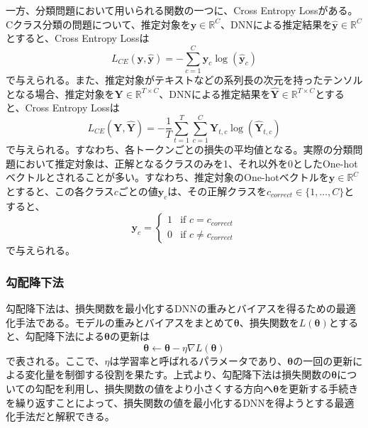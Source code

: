 \documentclass[12pt]{jarticle}
\numberwithin{equation}{section}    %
\numberwithin{figure}{section}      %
\numberwithin{table}{section}      %
\begin{document}
一方、分類問題において用いられる関数の一つに、Cross Entropy Lossがある。Cクラス分類の問題について、推定対象を$\bm{y} \in \mathbb{R}^{C}$、DNNによる推定結果を$\hat{\bm{y}} \in \mathbb{R}^{C}$とすると、Cross Entropy Lossは
\begin{equation}
    L_{CE}(\bm{y}, \hat{\bm{y}}) = - \sum_{c = 1}^{C} \bm{y}_{c}\log(\hat{\bm{y}}_{c})
\end{equation}
で与えられる。また、推定対象がテキストなどの系列長の次元を持ったテンソルとなる場合、推定対象を$\bm{Y} \in \mathbb{R}^{T \times C}$、DNNによる推定結果を$\hat{\bm{Y}} \in \mathbb{R}^{T \times C}$とすると、Cross Entropy Lossは
\begin{equation}
    L_{CE}(\bm{Y}, \hat{\bm{Y}}) = - \frac{1}{T} \sum_{t = 1}^{T} \sum_{c = 1}^{C} \bm{Y}_{t, c}\log(\hat{\bm{Y}}_{t, c})
\end{equation}
で与えられる。すなわち、各トークンごとの損失の平均値となる。実際の分類問題において推定対象は、正解となるクラスのみを1、それ以外を0としたOne-hotベクトルとされることが多い。すなわち、推定対象のOne-hotベクトルを$\bm{y} \in \mathbb{R}^{C}$とすると、この各クラス$c$ごとの値$\bm{y}_{c}$は、その正解クラスを$c_{correct} \in \{1, \ldots, C\}$とすると、
\begin{equation}
    \bm{y}_{c} =
    \begin{cases}
        1 & \text{if $c = c_{correct}$}   \\
        0 & \text{if $c \ne c_{correct}$}
    \end{cases}
\end{equation}
で与えられる。

\subsubsection{勾配降下法}
\label{sec3:sec:gradient_descent}
勾配降下法は、損失関数を最小化するDNNの重みとバイアスを得るための最適化手法である。モデルの重みとバイアスをまとめて$\bm{\theta}$、損失関数を$L(\bm{\theta})$とすると、勾配降下法による$\bm{\theta}$の更新は
\begin{equation}
    \bm{\theta} \leftarrow \bm{\theta} - \eta \nabla L(\bm{\theta})
\end{equation}
で表される。ここで、$\eta$は学習率と呼ばれるパラメータであり、$\bm{\theta}$の一回の更新による変化量を制御する役割を果たす。上式より、勾配降下法は損失関数の$\bm{\theta}$についての勾配を利用し、損失関数の値をより小さくする方向へ$\bm{\theta}$を更新する手続きを繰り返すことによって、損失関数の値を最小化するDNNを得ようとする最適化手法だと解釈できる。
\end{document}
